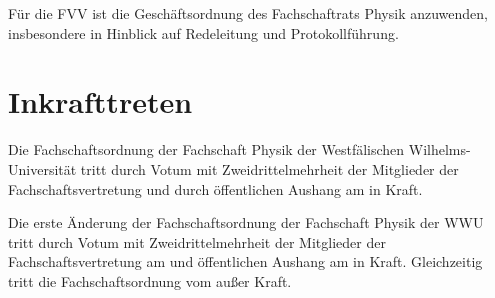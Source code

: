 \documentclass[
	a4paper,
	12pt,
	oneside,
	parskip=half-,
	pagesize,
	headsepline,
	german,
	ngerman
]{scrartcl}
\begin{document}
Für die FVV ist die Geschäftsordnung des Fachschaftrats Physik anzuwenden, insbesondere in Hinblick auf Redeleitung und Protokollführung.

\section{Inkrafttreten}
Die Fachschaftsordnung der Fachschaft Physik der Westfälischen Wilhelms-Universität tritt durch Votum mit Zweidrittelmehrheit der Mitglieder der Fachschaftsvertretung und durch öffentlichen Aushang am  in Kraft.

Die erste Änderung der Fachschaftsordnung der Fachschaft Physik der WWU tritt durch Votum mit Zweidrittelmehrheit der Mitglieder der Fachschaftsvertretung am  und öffentlichen Aushang am  in Kraft. Gleichzeitig tritt die Fachschaftsordnung vom  außer Kraft.
\end{document}
